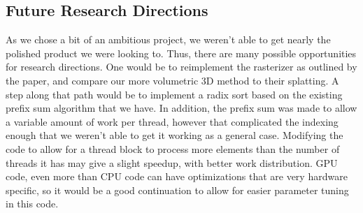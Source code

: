 \documentclass[12pt, a4paper, twocolumn]{article}
\begin{document}
\subsection{Future Research Directions}
As we chose a bit of an ambitious project, we weren't able to get nearly the polished product we were looking to. Thus, there are many possible opportunities for research directions. One would be to reimplement the rasterizer as outlined by the paper, and compare our more volumetric 3D method to their splatting. A step along that path would be to implement a radix sort based on the existing prefix sum algorithm that we have. In addition, the prefix sum was made to allow a variable amount of work per thread, however that complicated the indexing enough that we weren't able to get it working as a general case. Modifying the code to allow for a thread block to process more elements than the number of threads it has may give a slight speedup, with better work distribution. GPU code, even more than CPU code can have optimizations that are very hardware specific, so it would be a good continuation to allow for easier parameter tuning in this code.




\nocite{*}


\end{document}
